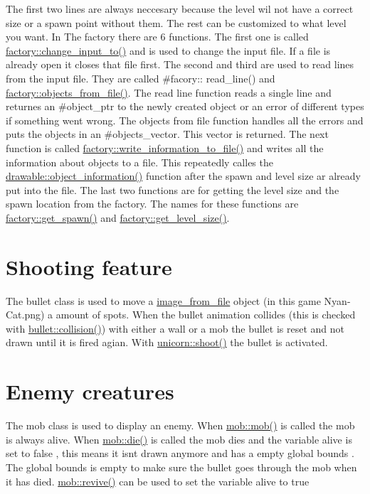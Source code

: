 The first two lines are always neccesary because the level wil not have a correct size or a spawn point without them. The rest can be customized to what level you want. In The factory there are 6 functions. The first one is called \hyperlink{classfactory_a9e164a8fbb65188de99c39d55d7cc384}{factory\+::change\+\_\+input\+\_\+to()} and is used to change the input file. If a file is already open it closes that file first. The second and third are used to read lines from the input file. They are called \#facory\+:\+: read\+\_\+line() and \hyperlink{classfactory_afb2fad4ac9b0f39b1bfc3f3fc8d218b6}{factory\+::objects\+\_\+from\+\_\+file()}. The read line function reads a single line and returnes an \#object\+\_\+ptr to the newly created object or an error of different types if something went wrong. The objects from file function handles all the errors and puts the objects in an \#objects\+\_\+vector. This vector is returned. The next function is called \hyperlink{classfactory_af17f2a44d75cf8ccf712384341c2fcde}{factory\+::write\+\_\+information\+\_\+to\+\_\+file()} and writes all the information about objects to a file. This repeatedly calles the \hyperlink{classdrawable_a2ed0f8bb53f33477f7722efa7bb24583}{drawable\+::object\+\_\+information()} function after the spawn and level size ar already put into the file. The last two functions are for getting the level size and the spawn location from the factory. The names for these functions are \hyperlink{classfactory_a3c3a039b8f76a947267dbe659166550b}{factory\+::get\+\_\+spawn()} and \hyperlink{classfactory_af9bb026273b34fc032ca5ac73d457611}{factory\+::get\+\_\+level\+\_\+size()}.\hypertarget{index_bullet}{}\section{Shooting feature}\label{index_bullet}
The bullet class is used to move a \hyperlink{classimage__from__file}{image\+\_\+from\+\_\+file} object (in this game Nyan-\/\+Cat.\+png) a amount of spots. When the bullet animation collides (this is checked with \hyperlink{classbullet_ab7e5c677bbd642df24a2251bb58249b7}{bullet\+::collision()}) with either a wall or a mob the bullet is reset and not drawn until it is fired agian. With \hyperlink{classunicorn_af448a3fa5fc5f09254b50afa151ce42b}{unicorn\+::shoot()} the bullet is activated.\hypertarget{index_mob}{}\section{Enemy creatures}\label{index_mob}
The mob class is used to display an enemy. When \hyperlink{classmob_ac524dd40986df00721239b66c552437e}{mob\+::mob()} is called the mob is always alive. When \hyperlink{classmob_ae892b3ce84f4aa16411b385abb5410c8}{mob\+::die()} is called the mob dies and the variable alive is set to false , this means it isn\textquotesingle{}t drawn anymore and has a empty global bounds . The global bounds is empty to make sure the bullet goes through the mob when it has died. \hyperlink{classmob_a3bce6c06653881f8be86fbc60a2b67cb}{mob\+::revive()} can be used to set the variable alive to true 